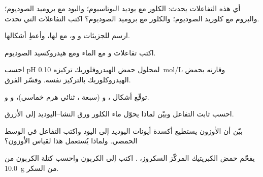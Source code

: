 \begin{exercise}[$\star$]\label{exo:b1:p-block-16-18:2}
أي هذه التفاعلات يحدث: الكلور مع يوديد البوتاسيوم؛ واليود مع
بروميد الصوديوم؛ والبروم مع كلوريد الصوديوم؛ والكلور مع بروميد الصوديوم؟
اكتب التفاعلات التي تحدث.
\end{exercise}

\begin{exercise}[$\star$]\label{exo:b1:p-block-16-18:3}
ارسم  للجزيئات  و و، مع
 لها، وأعطِ أشكالها.
\end{exercise}

\begin{exercise}[$\star$]\label{exo:b1:p-block-16-18:4}
اكتب تفاعلات  و مع الماء ومع هيدروكسيد
الصوديوم.
\end{exercise}

\begin{exercise}[$\star\star$]\label{exo:b1:p-block-16-18:5}
احسب pH لمحلول حمض الهيدروفلوريك تركيزه \qty{0.10}{mol/L} وقارنه
بحمض الهيدروكلوريك بالتركيز نفسه. وفسّر الفرق.
\end{exercise}

\begin{exercise}[$\star\star$]\label{exo:b1:p-block-16-18:6}
توقّع  أشكال ، و (سبعة ،
ثنائي هرم خماسي)، و و.
\end{exercise}

\begin{exercise}[$\star\star$]\label{exo:b1:p-block-16-18:7}
احسب ثابت التفاعل  وبيّن لماذا يحوّل ماء
الكلور ورق النشا--اليوديد إلى الأزرق.
\end{exercise}

\begin{exercise}[$\star\star$]\label{exo:b1:p-block-16-18:8}
بيّن أن الأوزون يستطيع أكسدة أيونات اليوديد إلى اليود واكتب التفاعل في
الوسط الحمضي. ولماذا يُستعمل هذا لقياس الأوزون؟
\end{exercise}

\begin{exercise}[$\star\star$]\label{exo:b1:p-block-16-18:9}
يفحّم حمض الكبريتيك المركّز السكروز، . اكتب
 إلى الكربون واحسب كتلة الكربون من \qty{10.0}{g} من
السكر.
\end{exercise}

